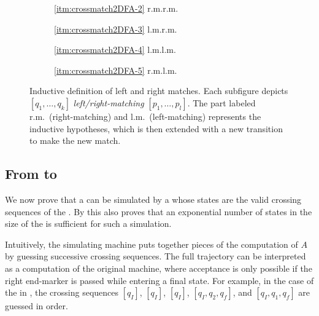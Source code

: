 \begin{figure}
	\centering
	\begin{subfigure}{0.246\textwidth}
		\centering
		
		\caption*{\ref{itm:crossmatch2DFA-2} r.m.\tto r.m.}
	\end{subfigure}
	\hfill
	\begin{subfigure}{0.242\textwidth}
		\centering
		
		\caption*{\ref{itm:crossmatch2DFA-3} l.m.\tto r.m.}
	\end{subfigure}
	\hfill
	\begin{subfigure}{0.242\textwidth}
		\centering
		
		\caption*{\ref{itm:crossmatch2DFA-4} l.m.\tto l.m.}
	\end{subfigure}
	\hfill
	\begin{subfigure}{0.246\textwidth}
		\centering
		
		\caption*{\ref{itm:crossmatch2DFA-5} r.m.\tto l.m.}
	\end{subfigure}
	\caption[The rules in the definition of matching crossing sequences.]{Inductive definition of left and right matches. Each subfigure depicts $[q_1,\dots,q_k]$ \emph{left/right-matching} $[p_1,\dots,p_l]$. The part labeled r.m.\ (right-matching) and l.m.\ (left-matching) represents the inductive hypotheses, which is then extended with a new transition to make the new match.}
	\label{fig:2DFA-crossmatch}
\end{figure}


\subsection{From \texorpdfstring{\TDFAs}{2DFAs} to \texorpdfstring{\ONFAs}{1NFAs}}
We now prove that a \TDFA can be simulated by a \ONFA whose states are the valid crossing sequences of the \TDFA.
By  this also proves that an exponential number of states in the size of the \TDFA is sufficient for such a simulation.

Intuitively, the simulating machine puts together pieces of the computation of $A$ by guessing successive crossing sequences.
The full trajectory can be interpreted as a computation of the original machine, where acceptance is only possible if the right end-marker is passed while entering a final state.
For example, in the case of the \TDFA in , the crossing sequences $[q_I]$, $[q_I]$, $[q_I]$, $[q_I,q_2,q_f]$, and $[q_I,q_1,q_f]$ are guessed in order.

